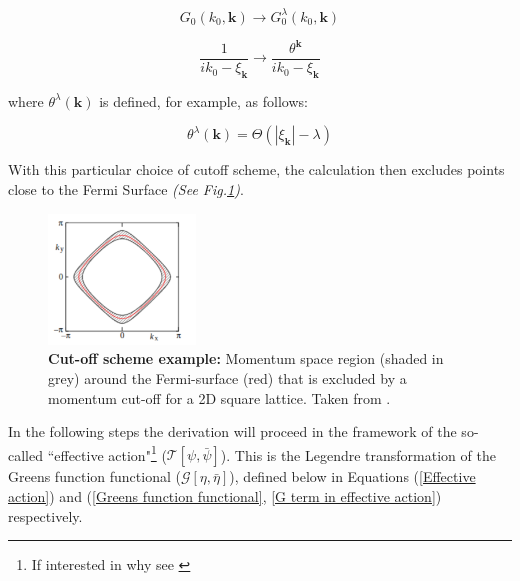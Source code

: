 \documentclass[12pt]{article}
\begin{document}
\begin{equation} \label{propagator transform 1}
    G_0(k_0, \textbf{k}) \rightarrow G_0^{\lambda}(k_0, \textbf{k})
\end{equation}


\begin{equation} \label{propagator transform 2}
    \frac{1}{ik_0 - \xi_{\textbf{k}}} \rightarrow \frac{\theta^{\textbf{k}}}{ik_0 - \xi_{\textbf{k}}}
\end{equation}

\noindent where $\theta^{\lambda}(\textbf{k})$ is defined, for example, as follows:

\begin{equation} \label{theta def}
    \theta^{\lambda}(\textbf{k}) = \Theta(|\xi_{\textbf{k}}| - \lambda)    
\end{equation}

\noindent With this particular choice of cutoff scheme, the calculation then excludes points close to the Fermi Surface \textit{(See Fig.\ref{fig:Truncation})}. \par
\begin{figure}[htbp]  %
    \centering
    \includegraphics[width=0.35\textwidth]{Truncation.png}  %
    \caption{\textbf{Cut-off scheme example:} Momentum space region (shaded in grey) around the Fermi-surface (red) that is excluded 
    by a momentum cut-off for a 2D square lattice. Taken from \cite {metzner2012functional}.}
    \label{fig:Truncation}
\end{figure}

\medskip
\noindent In the following steps the derivation will proceed in the framework of the  so-called ``effective action"\footnote{If interested in why see \cite{metzner2012functional}}  ($\mathcal{T}[\psi, \bar{\psi}]$).
This is the Legendre transformation of the Greens function functional ($\mathcal{G}[\eta, \bar{\eta}]$), defined below in Equations (\ref{Effective action})  and  (\ref{Greens function functional}, \ref{G term in effective action}) respectively. 
\end{document}
